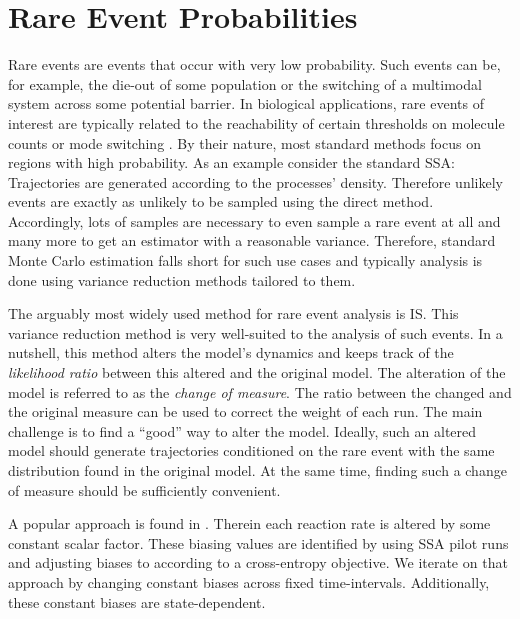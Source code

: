 \chapter{Rare Event Probabilities}\label{ch:is}
Rare events are events that occur with very low probability.
Such events can be, for example, the die-out of some population or
the switching of a multimodal system across some potential barrier.
In biological applications, rare events of interest are typically
related to the reachability of certain thresholds on molecule counts
or mode switching \parencite{strasser2012stability}.
By their nature, most standard methods focus on regions with high probability.
As an example consider the standard \ac{SSA}:
Trajectories are generated according to the processes' density.
Therefore unlikely events are exactly as unlikely to be sampled using
the direct method.
Accordingly, lots of samples are necessary to even sample a rare
event at all and many more to get an estimator with a reasonable variance.
Therefore, standard Monte Carlo estimation falls short for such use
cases and typically analysis is done using variance reduction methods
tailored to them.

The arguably most widely used method for rare event analysis is \acf{IS}.
This variance reduction method is very well-suited to the analysis of
such events.
In a nutshell, this method alters the model's dynamics and keeps
track of the \emph{likelihood ratio} between this altered and the
original model.
The alteration of the model is referred to as the \emph{change of measure}.
The ratio between the changed and the original measure can be used to
correct the weight of each run.
The main challenge is to find a ``good'' way to alter the model.
Ideally, such an altered model should generate trajectories
conditioned on the rare event with the same distribution found in the
original model.
At the same time, finding such a change of measure should be
sufficiently convenient.

A popular approach is found in 
\parencite{kuwahara2008efficient,daigle2011automated}.
Therein each reaction rate is altered by some constant scalar factor.
These biasing values are identified by using \ac{SSA} pilot runs and
adjusting biases to according to a cross-entropy objective.
We iterate on that approach by changing constant biases across fixed
time-intervals.
Additionally, these constant biases are state-dependent.


